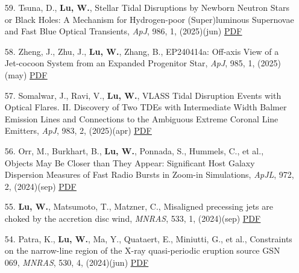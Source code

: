 \begin{itemize}[leftmargin=0.65cm]
\vspace{-0.1cm}
\item[59.]{Tsuna, D., {\bf Lu, W.}, {Stellar Tidal Disruptions by Newborn Neutron Stars or Black Holes: A Mechanism for Hydrogen-poor (Super)luminous Supernovae and Fast Blue Optical Transients}, {\it ApJ}, 986, 1, (2025)(jun) \href{https://ui.adsabs.harvard.edu/abs/2025ApJ...986...84T}{\underline{PDF}}}

\vspace{-0.1cm}
\item[58.]{Zheng, J., Zhu, J., {\bf Lu, W.}, Zhang, B., {EP240414a: Off-axis View of a Jet-cocoon System from an Expanded Progenitor Star}, {\it ApJ}, 985, 1, (2025)(may) \href{https://ui.adsabs.harvard.edu/abs/2025ApJ...985...21Z}{\underline{PDF}}}

\vspace{-0.1cm}
\item[57.]{Somalwar, J., Ravi, V., {\bf Lu, W.}, {VLASS Tidal Disruption Events with Optical Flares. II. Discovery of Two TDEs with Intermediate Width Balmer Emission Lines and Connections to the Ambiguous Extreme Coronal Line Emitters}, {\it ApJ}, 983, 2, (2025)(apr) \href{https://ui.adsabs.harvard.edu/abs/2025ApJ...983..159S}{\underline{PDF}}}

\vspace{-0.1cm}
\item[56.]{Orr, M., Burkhart, B., {\bf Lu, W.}, Ponnada, S., Hummels, C., et al., {Objects May Be Closer than They Appear: Significant Host Galaxy Dispersion Measures of Fast Radio Bursts in Zoom-in Simulations}, {\it ApJL}, 972, 2, (2024)(sep) \href{https://ui.adsabs.harvard.edu/abs/2024ApJ...972L..26O}{\underline{PDF}}}

\vspace{-0.1cm}
\item[55.]{{\bf Lu, W.}, Matsumoto, T., Matzner, C., {Misaligned precessing jets are choked by the accretion disc wind}, {\it MNRAS}, 533, 1, (2024)(sep) \href{https://ui.adsabs.harvard.edu/abs/2024MNRAS.533..979L}{\underline{PDF}}}

\vspace{-0.1cm}
\item[54.]{Patra, K., {\bf Lu, W.}, Ma, Y., Quataert, E., Miniutti, G., et al., {Constraints on the narrow-line region of the X-ray quasi-periodic eruption source GSN 069}, {\it MNRAS}, 530, 4, (2024)(jun) \href{https://ui.adsabs.harvard.edu/abs/2024MNRAS.530.5120P}{\underline{PDF}}}


\end{itemize}
